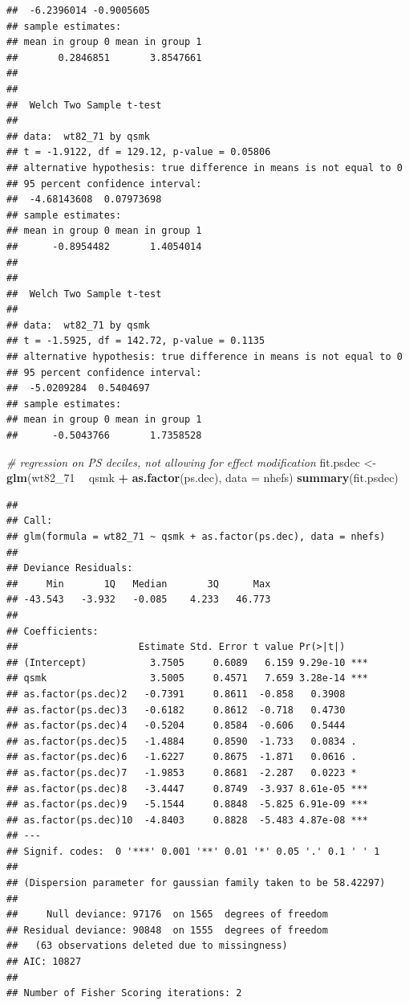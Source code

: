 \documentclass[
  10pt,
]{book}
\newenvironment{Shaded}{\begin{snugshade}}{\end{snugshade}}
\newcommand{\CommentTok}[1]{\textcolor[rgb]{0.56,0.35,0.01}{\textit{#1}}}
\newcommand{\DataTypeTok}[1]{\textcolor[rgb]{0.13,0.29,0.53}{#1}}
\newcommand{\DecValTok}[1]{\textcolor[rgb]{0.00,0.00,0.81}{#1}}
\newcommand{\KeywordTok}[1]{\textcolor[rgb]{0.13,0.29,0.53}{\textbf{#1}}}
\newcommand{\NormalTok}[1]{#1}
\newcommand{\OperatorTok}[1]{\textcolor[rgb]{0.81,0.36,0.00}{\textbf{#1}}}
\newcommand{\StringTok}[1]{\textcolor[rgb]{0.31,0.60,0.02}{#1}}
\begin{document}
\begin{verbatim}
##  -6.2396014 -0.9005605
## sample estimates:
## mean in group 0 mean in group 1 
##       0.2846851       3.8547661 
## 
## 
## 	Welch Two Sample t-test
## 
## data:  wt82_71 by qsmk
## t = -1.9122, df = 129.12, p-value = 0.05806
## alternative hypothesis: true difference in means is not equal to 0
## 95 percent confidence interval:
##  -4.68143608  0.07973698
## sample estimates:
## mean in group 0 mean in group 1 
##      -0.8954482       1.4054014 
## 
## 
## 	Welch Two Sample t-test
## 
## data:  wt82_71 by qsmk
## t = -1.5925, df = 142.72, p-value = 0.1135
## alternative hypothesis: true difference in means is not equal to 0
## 95 percent confidence interval:
##  -5.0209284  0.5404697
## sample estimates:
## mean in group 0 mean in group 1 
##      -0.5043766       1.7358528
\end{verbatim}

\begin{Shaded}
\begin{Highlighting}[]
\CommentTok{# regression on PS deciles, not allowing for effect modification}
\NormalTok{fit.psdec <-}\StringTok{ }\KeywordTok{glm}\NormalTok{(wt82_}\DecValTok{71} \OperatorTok{~}\StringTok{ }\NormalTok{qsmk }\OperatorTok{+}\StringTok{ }\KeywordTok{as.factor}\NormalTok{(ps.dec), }\DataTypeTok{data =}\NormalTok{ nhefs)}
\KeywordTok{summary}\NormalTok{(fit.psdec)}
\end{Highlighting}
\end{Shaded}

\begin{verbatim}
## 
## Call:
## glm(formula = wt82_71 ~ qsmk + as.factor(ps.dec), data = nhefs)
## 
## Deviance Residuals: 
##     Min       1Q   Median       3Q      Max  
## -43.543   -3.932   -0.085    4.233   46.773  
## 
## Coefficients:
##                     Estimate Std. Error t value Pr(>|t|)    
## (Intercept)           3.7505     0.6089   6.159 9.29e-10 ***
## qsmk                  3.5005     0.4571   7.659 3.28e-14 ***
## as.factor(ps.dec)2   -0.7391     0.8611  -0.858   0.3908    
## as.factor(ps.dec)3   -0.6182     0.8612  -0.718   0.4730    
## as.factor(ps.dec)4   -0.5204     0.8584  -0.606   0.5444    
## as.factor(ps.dec)5   -1.4884     0.8590  -1.733   0.0834 .  
## as.factor(ps.dec)6   -1.6227     0.8675  -1.871   0.0616 .  
## as.factor(ps.dec)7   -1.9853     0.8681  -2.287   0.0223 *  
## as.factor(ps.dec)8   -3.4447     0.8749  -3.937 8.61e-05 ***
## as.factor(ps.dec)9   -5.1544     0.8848  -5.825 6.91e-09 ***
## as.factor(ps.dec)10  -4.8403     0.8828  -5.483 4.87e-08 ***
## ---
## Signif. codes:  0 '***' 0.001 '**' 0.01 '*' 0.05 '.' 0.1 ' ' 1
## 
## (Dispersion parameter for gaussian family taken to be 58.42297)
## 
##     Null deviance: 97176  on 1565  degrees of freedom
## Residual deviance: 90848  on 1555  degrees of freedom
##   (63 observations deleted due to missingness)
## AIC: 10827
## 
## Number of Fisher Scoring iterations: 2
\end{verbatim}
\end{document}
